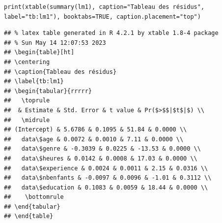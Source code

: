 \documentclass[a4paper, french, 11 pt]{article}\usepackage[]{graphicx}\usepackage[]{xcolor}
\makeatletter
\newenvironment{kframe}{%
 \def\at@end@of@kframe{}%
 \ifinner\ifhmode%
  \def\at@end@of@kframe{\end{minipage}}%
  \begin{minipage}{\columnwidth}%
 \fi\fi%
 \def\FrameCommand##1{\hskip\@totalleftmargin \hskip-\fboxsep
 \colorbox{shadecolor}{##1}\hskip-\fboxsep
     \hskip-\linewidth \hskip-\@totalleftmargin \hskip\columnwidth}%
 \MakeFramed {\advance\hsize-\width
   \@totalleftmargin\z@ \linewidth\hsize
   \@setminipage}}%
 {\par\unskip\endMakeFramed%
 \at@end@of@kframe}
\newenvironment{knitrout}{}{} %
\makeatother
\begin{document}
\begin{knitrout}
\begin{kframe}
\begin{lstlisting}[basicstyle=\ttfamily,breaklines=true]
\end{lstlisting}
\begin{lstlisting}[basicstyle=\ttfamily,breaklines=true]
print(xtable(summary(lm1), caption="Tableau des résidus", label="tb:lm1"), booktabs=TRUE, caption.placement="top")\end{lstlisting}
\begin{lstlisting}[basicstyle=\ttfamily,breaklines=true]
## % latex table generated in R 4.2.1 by xtable 1.8-4 package
## % Sun May 14 12:07:53 2023
## \begin{table}[ht]
## \centering
## \caption{Tableau des résidus} 
## \label{tb:lm1}
## \begin{tabular}{rrrrr}
##   \toprule
##  & Estimate & Std. Error & t value & Pr($>$$|$t$|$) \\ 
##   \midrule
## (Intercept) & 5.6786 & 0.1095 & 51.84 & 0.0000 \\ 
##   data\$age & 0.0072 & 0.0010 & 7.11 & 0.0000 \\ 
##   data\$genre & -0.3039 & 0.0225 & -13.53 & 0.0000 \\ 
##   data\$heures & 0.0142 & 0.0008 & 17.03 & 0.0000 \\ 
##   data\$experience & 0.0024 & 0.0011 & 2.15 & 0.0316 \\ 
##   data\$nbenfants & -0.0097 & 0.0096 & -1.01 & 0.3112 \\ 
##   data\$education & 0.1083 & 0.0059 & 18.44 & 0.0000 \\ 
##    \bottomrule
## \end{tabular}
## \end{table}
\end{lstlisting}
\end{kframe}
\end{knitrout}
\end{document}
